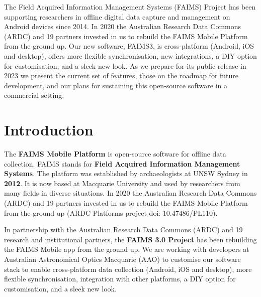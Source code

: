 \documentclass[a0,portrait]{a0poster}
\begin{document}
\begin{multicols}{3} %

\begingroup
{
\color{faimsblue} %


The Field Acquired Information Management Systems (FAIMS) Project has been supporting researchers in offline digital data capture and management on Android devices since 2014. In 2020 the Australian Research Data Commons (ARDC) and 19 partners invested in us to rebuild the FAIMS Mobile Platform from the ground up. Our new software, FAIMS3, is cross-platform (Android, iOS and desktop), offers more flexible synchronisation, new integrations, a DIY option for customisation, and a sleek new look. As we prepare for its public release in 2023 we present the current set of features, those on the roadmap for future development, and our plans for sustaining this open-source software in a commercial setting.}
\endgroup
\color{Black} %



\section*{Introduction}

The \textbf{FAIMS Mobile Platform} is open-source software for offline data collection. FAIMS stands for \textbf{Field Acquired Information Management Systems}. The platform was established by archaeologists at UNSW Sydney in \textbf{2012}. It is now based at Macquarie University and used by researchers from many fields in diverse situations. In 2020 the Australian Research Data Commons (ARDC) and 19 partners invested in us to rebuild the FAIMS Mobile Platform from the ground up (ARDC Platforms project doi: 10.47486/PL110). 

In partnership with the Australian Research Data Commons (ARDC) and 19 research and institutional partners, the \textbf{FAIMS 3.0 Project} has been rebuilding the FAIMS Mobile app from the ground up. We are working with developers at Australian Astronomical Optics Macquarie (AAO) to customise our software stack to enable cross-platform data collection (Android, iOS and desktop), more flexible synchronisation, integration with other platforms, a DIY option for customisation, and a sleek new look.


\end{multicols}
\end{document}
